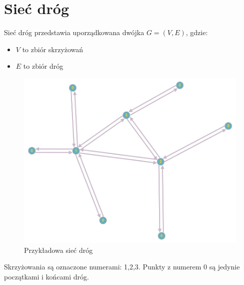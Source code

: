 \documentclass[12pt]{book}
\begin{document}
\section{Sieć dróg}
Sieć dróg przedstawia uporządkowana dwójka $G=(V,E)$, gdzie:
\begin{itemize}
\item $V$ to zbiór skrzyżowań
\item $E$ to zbiór dróg
\end{itemize}
\begin{minipage}{12cm}
\begin{figure}[H]
\includegraphics[width=12cm]{network}
\caption{\label{fig:network} Przykładowa sieć dróg}
\end{figure}
\end{minipage} \hfill
\begin{minipage}{5cm}
Skrzyżowania są oznaczone numerami: 1,2,3.
Punkty z numerem 0 są jedynie początkami i końcami dróg.
\end{minipage}
 \noindent
\end{document}
